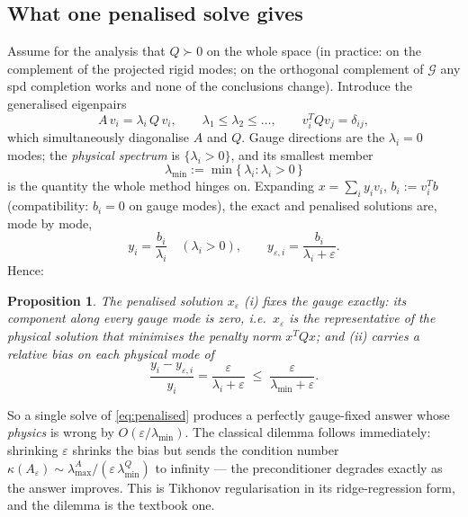 \documentclass[11pt]{article}
\newtheorem{proposition}{Proposition}
\newcommand{\eps}{\varepsilon}
\begin{document}
\subsection{What one penalised solve gives}
\label{sec:onesolve}

Assume for the analysis that $Q \succ 0$ on the whole space (in
practice: on the complement of the projected rigid modes; on the
orthogonal complement of $\mathcal{G}$ any spd completion works and
none of the conclusions change). Introduce the generalised eigenpairs
\begin{equation}
  A\, v_{i} = \lambda_{i}\, Q\, v_{i}, \qquad
  \lambda_{1} \le \lambda_{2} \le \dots , \qquad
  v_{i}^{T} Q v_{j} = \delta_{ij} ,
  \label{eq:gevp}
\end{equation}
which simultaneously diagonalise $A$ and $Q$. Gauge directions are the
$\lambda_{i} = 0$ modes; the \emph{physical spectrum} is
$\{\lambda_{i} > 0\}$, and its smallest member
\begin{equation}
  \lambda_{\min} := \min \{\, \lambda_{i} : \lambda_{i} > 0 \,\}
  \label{eq:lmin}
\end{equation}
is the quantity the whole method hinges on. Expanding
$x = \sum_i y_i v_i$, $b_i := v_i^T b$ (compatibility: $b_{i} = 0$ on
gauge modes), the exact and penalised solutions are, mode by mode,
\begin{equation}
  y_{i} = \frac{b_{i}}{\lambda_{i}} \quad (\lambda_{i} > 0), \qquad
  y_{\eps,i} = \frac{b_{i}}{\lambda_{i} + \eps} .
\end{equation}
Hence:
\begin{proposition}
  The penalised solution $x_{\eps}$ (i) fixes the gauge exactly: its
  component along every gauge mode is zero, i.e.\ $x_\eps$ is the
  representative of the physical solution that minimises the penalty
  norm $x^{T} Q x$; and (ii) carries a relative bias on each physical
  mode of
  \begin{equation}
    \frac{y_{i} - y_{\eps,i}}{y_{i}}
      = \frac{\eps}{\lambda_{i} + \eps}
      \;\le\; \frac{\eps}{\lambda_{\min} + \eps} .
    \label{eq:bias}
  \end{equation}
\end{proposition}
So a single solve of \eqref{eq:penalised} produces a perfectly
gauge-fixed answer whose \emph{physics} is wrong by
$O(\eps/\lambda_{\min})$. The classical dilemma follows immediately:
shrinking $\eps$ shrinks the bias but sends the condition number
$\kappa(A_{\eps}) \sim \lambda_{\max}^{A}/(\eps\,\lambda_{\min}^{Q})$ to
infinity --- the preconditioner degrades exactly as the answer improves.
This is Tikhonov regularisation in its ridge-regression form, and the
dilemma is the textbook one.
\end{document}
